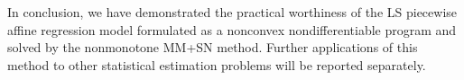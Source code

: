 \documentclass{siamart}
\begin{document}



In conclusion, we have demonstrated the practical worthiness of the LS piecewise affine regression model
formulated as a nonconvex nondifferentiable program and solved by the nonmonotone MM+SN method.  Further
applications of this method to other statistical estimation problems will be reported separately.
\end{document}
